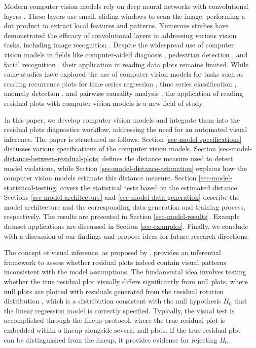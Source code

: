 \documentclass[]{interact}
\theoremstyle{plain}%
\theoremstyle{definition}
\theoremstyle{remark}
\begin{document}
Modern computer vision models rely on deep neural networks with
convolutional layers \citep{fukushima1982neocognitron}. These layers use
small, sliding windows to scan the image, performing a dot product to
extract local features and patterns. Numerous studies have demonstrated
the efficacy of convolutional layers in addressing various vision tasks,
including image recognition \citep{rawat2017deep}. Despite the
widespread use of computer vision models in fields like computer-aided
diagnosis \citep{lee2015image}, pedestrian detection
\citep{brunetti2018computer}, and facial recognition
\citep{emami2012facial}, their application in reading data plots remains
limited. While some studies have explored the use of computer vision
models for tasks such as reading recurrence plots for time series
regression \citep{ojeda2020multivariate}, time series classification
\citep{chu2019automatic, hailesilassie2019financial, hatami2018classification, zhang2020encoding},
anomaly detection \citep{chen2020convolutional}, and pairwise causality
analysis \citep{singh2017deep}, the application of reading residual
plots with computer vision models is a new field of study.

In this paper, we develop computer vision models and integrate them into
the residual plots diagnostics workflow, addressing the need for an
automated visual inference. The paper is structured as follows. Section
\ref{sec-model-specifications} discusses various specifications of the
computer vision models. Section
\ref{sec-model-distance-between-residual-plots} defines the distance
measure used to detect model violations, while Section
\ref{sec-model-distance-estimation} explains how the computer vision
models estimate this distance measure. Section
\ref{sec-model-statistical-testing} covers the statistical tests based
on the estimated distance. Sections \ref{sec-model-architecture} and
\ref{sec-model-data-generation} describe the model architecture and the
corresponding data generation and training process, respectively. The
results are presented in Section \ref{sec-model-results}. Example
dataset applications are discussed in Section \ref{sec-examples}.
Finally, we conclude with a discussion of our findings and propose ideas
for future research directions.

The concept of visual inference, as proposed by
\citet{buja2009statistical}, provides an inferential framework to assess
whether residual plots indeed contain visual patterns inconsistent with
the model assumptions. The fundamental idea involves testing whether the
true residual plot visually differs significantly from null plots, where
null plots are plotted with residuals generated from the residual
rotation distribution \citep{langsrud2005rotation}, which is a
distribution consistent with the null hypothesis \(H_0\) that the linear
regression model is correctly specified. Typically, the visual test is
accomplished through the lineup protocol, where the true residual plot
is embedded within a lineup alongside several null plots. If the true
residual plot can be distinguished from the lineup, it provides evidence
for rejecting \(H_0\).
\end{document}
